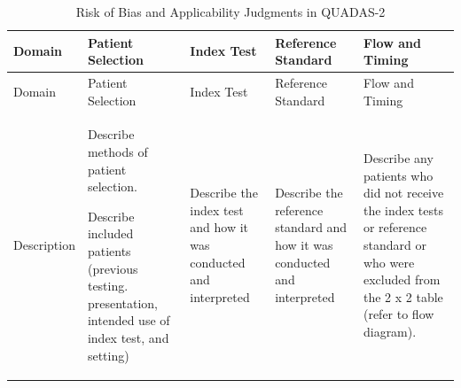 \documentclass[
  10pt,
  a4paper,
  DIV=11,
  numbers=noendperiod]{scrreprt}
\begin{document}
\begin{longtable}[]{@{}
  >{\raggedright\arraybackslash}p{}
  >{\raggedright\arraybackslash}p{}
  >{\raggedright\arraybackslash}p{}
  >{\raggedright\arraybackslash}p{}
  >{\raggedright\arraybackslash}p{}@{}}
\caption{Risk of Bias and Applicability Judgments in
QUADAS-2}\label{tbl-quad}\tabularnewline
\toprule\noalign{}
\begin{minipage}[b]{\linewidth}\raggedright
Domain
\end{minipage} & \begin{minipage}[b]{\linewidth}\raggedright
Patient Selection
\end{minipage} & \begin{minipage}[b]{\linewidth}\raggedright
Index Test
\end{minipage} & \begin{minipage}[b]{\linewidth}\raggedright
Reference Standard
\end{minipage} & \begin{minipage}[b]{\linewidth}\raggedright
Flow and Timing
\end{minipage} \\
\midrule\noalign{}
\endfirsthead
\toprule\noalign{}
\begin{minipage}[b]{\linewidth}\raggedright
Domain
\end{minipage} & \begin{minipage}[b]{\linewidth}\raggedright
Patient Selection
\end{minipage} & \begin{minipage}[b]{\linewidth}\raggedright
Index Test
\end{minipage} & \begin{minipage}[b]{\linewidth}\raggedright
Reference Standard
\end{minipage} & \begin{minipage}[b]{\linewidth}\raggedright
Flow and Timing
\end{minipage} \\
\midrule\noalign{}
\endhead
\bottomrule\noalign{}
\endlastfoot
Description & Describe methods of patient selection.

Describe included patients (previous testing. presentation, intended use
of index test, and setting) & Describe the index test and how it was
conducted and interpreted & Describe the reference standard and how it
was conducted and interpreted & Describe any patients who did not
receive the index tests or reference standard or who were excluded from
the 2 x 2 table (refer to flow diagram).


\end{longtable}
\end{document}
